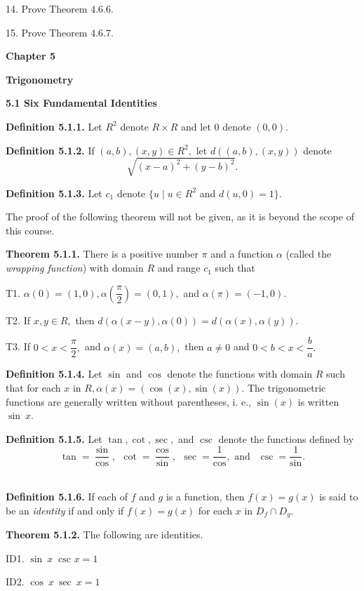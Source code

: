 14. Prove Theorem 4.6.6.\nl

15. Prove Theorem 4.6.7.\nl

\newpage
\textbf{Chapter 5}\nl

\textbf{Trigonometry}\nl

\textbf{5.1 Six Fundamental Identities}\nl

\textbf{Definition 5.1.1.} Let $R^{2}$ denote $R\times R$ and let $0$ denote $(0, 0). $\nl

\textbf{Definition 5.1.2.}  If $(a, b), (x,y)\in R^{2},$ let $d((a,b),(x, y))$ denote
\[
\sqrt{(x-a)^{2}+ (y-b)^{2}}.
\]

\textbf{Definition 5.1.3.}  Let $c_{1}$ denote $\{ u \mid u\in R^{2}$ and $d(u, 0) = 1\}.$\nl

The proof of the following theorem will not be given, as it is beyond the scope of this course.\nl

\textbf{Theorem 5.1.1.}   There is a positive number $\pi$ and a function $\alpha$ (called the \textit{wrapping function})
with domain $R$ and range $c_{1}$ such that\nl

T1.  $\alpha(0) = (1,0), \alpha\left(\dfrac{\pi}{2}\right) = (0, 1),$ and $\alpha(\pi) = (-1, 0).$\nl

T2.  If $x,y\in R,$ then $d(\alpha(x-y), \alpha (0)) = d(\alpha (x), \alpha(y)).$\nl

T3.  If $0 < x < \dfrac{\pi}{2},$ and $\alpha (x) = (a, b),$ then $a \neq 0$ and $0 < b < x < \dfrac{b}{a}.$\nl

\textbf{Definition 5.1.4.} Let $\sin$ and $\cos$ denote the functions with domain $R$ such that for each $x$ in $R, \alpha (x) = (\cos(x), \sin(x)).$  The trigonometric functions are generally written without parentheses, i. e., $\sin(x)$ is written $\sin~ x.$\nl

\textbf{Definition 5.1.5.}  Let $\tan, \cot, \sec, $ and $\csc$ denote the functions defined by
\[
\tan = \dfrac{\sin}{\cos},~~ \cot = \dfrac{\cos}{\sin},~~ \sec = \dfrac{1}{\cos}, \text{~and~} ~~\csc = \dfrac{1}{\sin}.
\]
$ $\nl

\textbf{Definition 5.1.6.}  If each of $f$ and $g$ is a function, then $f(x) = g(x)$ is said to be an \textit{identity} if and only if $f(x) = g(x)$ for each $x$ in $D_{f}\cap D_{g}.$\nl

\textbf{Theorem 5.1.2.}  The following are identities.\nl

ID1.  $\sin~x ~\text{~csc~}x = 1$\nl

ID2.  $\cos~x~\sec~x = 1$\nl


